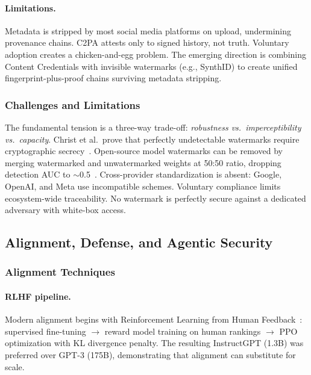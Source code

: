 \paragraph{Limitations.}
Metadata is stripped by most social media platforms on upload, undermining provenance chains. C2PA attests only to signed history, not truth. Voluntary adoption creates a chicken-and-egg problem. The emerging direction is combining Content Credentials with invisible watermarks (e.g., SynthID) to create unified fingerprint-plus-proof chains surviving metadata stripping.


\subsubsection{Challenges and Limitations}
\label{sec:wm-challenges}

The fundamental tension is a three-way trade-off: \emph{robustness vs.\ imperceptibility vs.\ capacity}. Christ et al.\ prove that perfectly undetectable watermarks require cryptographic secrecy~\cite{christ2024undetectable}. Open-source model watermarks can be removed by merging watermarked and unwatermarked weights at 50:50 ratio, dropping detection AUC to $\sim$0.5~\cite{xu2025removal}. Cross-provider standardization is absent: Google, OpenAI, and Meta use incompatible schemes. Voluntary compliance limits ecosystem-wide traceability. No watermark is perfectly secure against a dedicated adversary with white-box access.


\subsection{Alignment, Defense, and Agentic Security}
\label{sec:alignment}

\subsubsection{Alignment Techniques}
\label{sec:alignment-tech}

\paragraph{RLHF pipeline.}
Modern alignment begins with Reinforcement Learning from Human Feedback~\cite{ouyang2022rlhf}: supervised fine-tuning $\to$ reward model training on human rankings $\to$ PPO optimization with KL divergence penalty. The resulting InstructGPT (1.3B) was preferred over GPT-3 (175B), demonstrating that alignment can substitute for scale.


